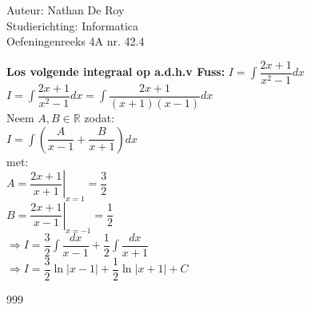 \documentclass[a4paper]{article}
\begin{document}
\noindent \large Auteur: Nathan De Roy \\
\noindent \large Studierichting: Informatica\\
\noindent \large Oefeningenreeks 4A nr. 42.4\\

\medskip
\normalsize


\textbf{Los volgende integraal op a.d.h.v Fuss:} $I = \displaystyle\int \dfrac{2x + 1}{x^2 - 1}dx$\\

$I = \displaystyle\int \dfrac{2x + 1}{x^2 - 1}dx = \displaystyle\int \dfrac{2x + 1}{(x + 1)(x - 1)}dx$\\

Neem $A, B \in \mathbb{R}$ zodat:\\

$I = \displaystyle\int \left( \dfrac{A}{x - 1} + \dfrac{B}{x + 1} \right) dx$\\

met:\\

$\left. A = \dfrac{2x + 1}{x + 1} \right|_{x=1} = \dfrac{3}{2}$\\

$\left. B = \dfrac{2x + 1}{x - 1} \right|_{x = -1} = \dfrac{1}{2}$\\

$\Rightarrow I = \dfrac{3}{2} \displaystyle\int \dfrac{dx}{x - 1} + \dfrac{1}{2} \displaystyle\int \dfrac{dx}{x + 1}$\\

$\Rightarrow I = \dfrac{3}{2} \ln|x - 1| + \dfrac{1}{2} \ln|x + 1| + C$\\

\begin{thebibliography}{999}
\end{thebibliography}
\end{document}
